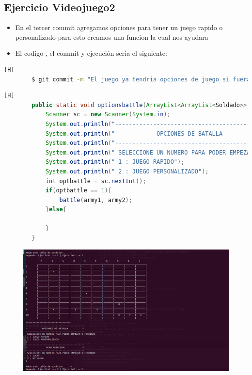 \documentclass{article}
\begin{document}
	\subsection{Ejercicio Videojuego2}
	\begin{itemize}	
		\item En el tercer commit agregamos opciones para tener un juego rapido o personalizado para esto creamos una funcion la cual nos ayudara  
		\item El codigo , el commit y ejecución seria el siguiente:
	\end{itemize}	
	\begin{lstlisting}[language=bash,caption={Commit}][H]
		$ git commit -m "El juego ya tendria opciones de juego si fuera un juego rapido falta el personalizado se agregan opciones para ver cual de estas se quiere jugar"
	\end{lstlisting}	
	\begin{lstlisting}[language=java,caption={Las lineas de codigos del metodo creado:}][H]
		public static void optionsbattle(ArrayList<ArrayList<Soldado>> army1 , ArrayList<ArrayList<Soldado>> army2){
			Scanner sc = new Scanner(System.in);
			System.out.println("-------------------------------------------");
			System.out.println("--          OPCIONES DE BATALLA          --"); 
			System.out.println("-------------------------------------------");
			System.out.println(" SELECCIONE UN NUMERO PARA PODER EMPEZAR O TERMINAR");
			System.out.println(" 1 : JUEGO RAPIDO");
			System.out.println(" 2 : JUEGO PERSONALIZADO");
			int optbattle = sc.nextInt();
			if(optbattle == 1){
				battle(army1, army2);
			}else{
	
			}
		}
	\end{lstlisting}
	\begin{figure}[H]
		\centering
		\includegraphics[width=1.0\textwidth,keepaspectratio]{img/Commit3.png}
	\end{figure}
\end{document}
